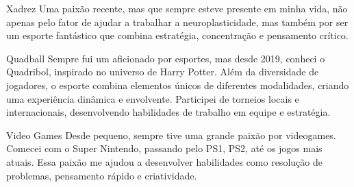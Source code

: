



\begin{cvskills}
  \vspace{0.2cm} %
  \cvskill
    {Xadrez} %
    {Uma paixão recente, mas que sempre esteve presente em minha vida, não apenas pelo fator de ajudar a trabalhar a neuroplasticidade, mas também por ser um esporte fantástico que combina estratégia, concentração e pensamento crítico.} %
    
  \vspace{0.2cm} %
  \cvskill
    {Quadball} %
    {Sempre fui um aficionado por esportes, mas desde 2019, conheci o Quadribol, inspirado no universo de Harry Potter. Além da diversidade de jogadores, o esporte combina elementos únicos de diferentes modalidades, criando uma experiência dinâmica e envolvente. Participei de torneios locais e internacionais, desenvolvendo habilidades de trabalho em equipe e estratégia.} %
    
  
  \vspace{0.2cm} %
  \cvskill
    {Video Games} %
    {Desde pequeno, sempre tive uma grande paixão por videogames. Comecei com o Super Nintendo, passando pelo PS1, PS2, até os jogos mais atuais. Essa paixão me ajudou a desenvolver habilidades como resolução de problemas, pensamento rápido e criatividade.} %

\end{cvskills}